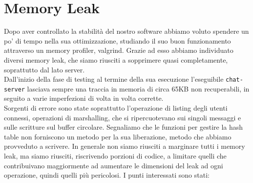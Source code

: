 \documentclass[a4paper, 11pt]{article} %
\begin{document}
\section*{Memory Leak}
Dopo aver controllato la stabilità del nostro software abbiamo voluto spendere un po' di tempo nella sua ottimizzazione, studiando il suo buon funzionamento attraverso un memory profiler, valgrind. Grazie ad esso abbiamo individuato diversi memory leak, che siamo riusciti a sopprimere quasi completamente, soprattutto dal lato server.\\
Dall'inizio della fase di testing al termine della sua esecuzione l'eseguibile \texttt{chat-server} lasciava sempre una traccia in memoria di circa 65KB non recuperabili, in seguito a varie imperfezioni di volta in volta corrette.\\
Sorgenti di errore sono state soprattutto l'operazione di listing degli utenti connessi, operazioni di marshalling, che si ripercuotevano sui singoli messaggi e sulle scritture sul buffer circolare. Segnaliamo che le funzioni per gestire la hash table non forniscono un metodo per la sua liberazione, metodo che abbiamo provveduto a scrivere.
In generale non siamo riusciti a marginare tutti i memory leak, ma siamo riusciti, riscrivendo porzioni di codice, a limitare quelli che contribuivano maggiormente ad aumentare le dimensioni del leak ad ogni operazione, quindi quelli più pericolosi. I punti interessati sono stati:
\end{document}
